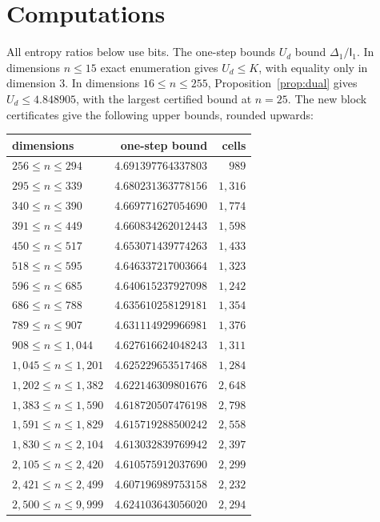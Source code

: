 \documentclass[11pt]{amsart}
\theoremstyle{definition}
\theoremstyle{remark}
\newcommand{\I}{\mathsf I}
\begin{document}
\section{Computations}\label{sec:computations}

All entropy ratios below use bits. The one-step bounds $U_d$ bound $\Delta_1/\I_1$. In dimensions $n\le15$ exact enumeration gives $U_d\le K$, with equality only in dimension $3$. In dimensions $16\le n\le255$, Proposition~\ref{prop:dual} gives $U_d\le4.848905$, with the largest certified bound at $n=25$. The new block certificates give the following upper bounds, rounded upwards:
\begin{center}
\begin{tabular}{@{}lrr@{}}
\toprule
dimensions & one-step bound & cells\\
\midrule
$256\le n\le 294$ & $4.691397764337803$ & $989$ \\
$295\le n\le 339$ & $4.680231363778156$ & $1{,}316$ \\
$340\le n\le 390$ & $4.669771627054690$ & $1{,}774$ \\
$391\le n\le 449$ & $4.660834262012443$ & $1{,}598$ \\
$450\le n\le 517$ & $4.653071439774263$ & $1{,}433$ \\
$518\le n\le 595$ & $4.646337217003664$ & $1{,}323$ \\
$596\le n\le 685$ & $4.640615237927098$ & $1{,}242$ \\
$686\le n\le 788$ & $4.635610258129181$ & $1{,}354$ \\
$789\le n\le 907$ & $4.631114929966981$ & $1{,}376$ \\
$908\le n\le 1{,}044$ & $4.627616624048243$ & $1{,}311$ \\
$1{,}045\le n\le 1{,}201$ & $4.625229653517468$ & $1{,}284$ \\
$1{,}202\le n\le 1{,}382$ & $4.622146309801676$ & $2{,}648$ \\
$1{,}383\le n\le 1{,}590$ & $4.618720507476198$ & $2{,}798$ \\
$1{,}591\le n\le 1{,}829$ & $4.615719288500242$ & $2{,}558$ \\
$1{,}830\le n\le 2{,}104$ & $4.613032839769942$ & $2{,}397$ \\
$2{,}105\le n\le 2{,}420$ & $4.610575912037690$ & $2{,}299$ \\
$2{,}421\le n\le 2{,}499$ & $4.607196989753158$ & $2{,}232$ \\
$2{,}500\le n\le 9{,}999$ & $4.624103643056020$ & $2{,}294$ \\

\end{tabular}
\end{center}
\end{document}
